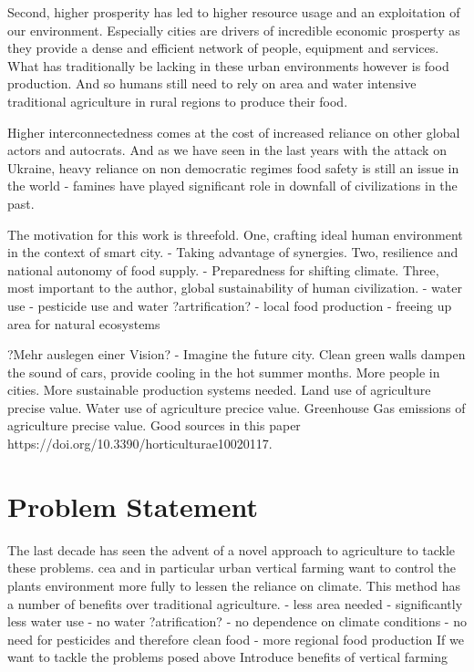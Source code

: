 Second, higher prosperity has led to higher resource usage and an exploitation of our environment.
Especially cities are drivers of incredible economic prosperty as they provide a dense and efficient network of people, equipment and services.
What has traditionally be lacking in these urban environments however is food production.
And so humans still need to rely on area and water intensive traditional agriculture in rural regions to produce their food.




Higher interconnectedness comes at the cost of increased reliance on other global actors and autocrats.
And as we have seen in the last years with the attack on Ukraine, heavy reliance on non democratic regimes 
food safety is still an issue in the world - famines have played significant role in downfall of civilizations in the past.

The motivation for this work is threefold.
One, crafting ideal human environment in the context of smart city.
- Taking advantage of synergies.
Two, resilience and national autonomy of food supply.
- Preparedness for shifting climate.
Three, most important to the author, global sustainability of human civilization.
- water use - pesticide use and water ?artrification? - local food production - freeing up area for natural ecosystems

?Mehr auslegen einer Vision? - Imagine the future city. Clean green walls dampen the sound of cars, provide cooling in the hot summer months. %
More people in cities.
More sustainable production systems needed.
Land use of agriculture precise value.
Water use of agriculture precice value.
Greenhouse Gas emissions of agriculture precise value.
Good sources in this paper https://doi.org/10.3390/horticulturae10020117.



\section{Problem Statement}
The last decade has seen the advent of a novel approach to agriculture to tackle these problems.
\ac{cea} and in particular urban vertical farming want to control the plants environment more fully to lessen the reliance on climate.
This method has a number of benefits over traditional agriculture.
- less area needed
- significantly less water use
- no water ?atrification?
- no dependence on climate conditions
- no need for pesticides and therefore clean food
- more regional food production
If we want to tackle the problems posed above
Introduce benefits of vertical farming

